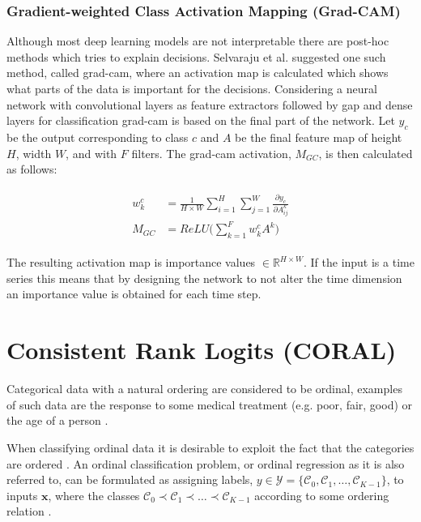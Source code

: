 \subsubsection{Gradient-weighted Class Activation Mapping (Grad-CAM)} \label{sec:grad-cam}
Although most deep learning models are not interpretable there are post-hoc methods which tries to explain decisions. Selvaraju et al. \cite{Selvaraju2016} suggested one such method, called \gls{grad-cam}, where an activation map is calculated which shows what parts of the data is important for the decisions. Considering a neural network with convolutional layers as feature extractors followed by \gls{gap} and dense layers for classification \gls{grad-cam} is based on the final part of the network. Let $y_c$ be the output corresponding to class $c$ and $A$ be the final feature map of height $H$, width $W$, and with $F$ filters. The \gls{grad-cam} activation, $M_{GC}$, is then calculated as follows:

\begin{align}
 \begin{split}
  w_k^c &= \frac{1}{H \times W} \sum_{i=1}^H \sum_{j=1}^W \frac{\partial y_c}{\partial A_{ij}^k} \\
  M_{GC} &= ReLU \big ( \sum_{k=1}^F w_k^c A^k \big)
  \label{eq:grad-cam}
 \end{split}
\end{align}

The resulting activation map is importance values $\in \mathbb{R}^{H \times W}$. If the input is a time series this means that by designing the network to not alter the time dimension an importance value is obtained for each time step.

\section{Consistent Rank Logits (CORAL)}
Categorical data with a natural ordering are considered to be ordinal, examples of such data are the response to some medical treatment (e.g. poor, fair, good) \cite{Agresti2007} or the age of a person \cite{Cao2019}.

When classifying ordinal data it is desirable to exploit the fact that the categories are ordered \cite{Agresti2007}. An ordinal classification problem, or ordinal regression as it is also referred to, can be formulated as assigning labels, $y \in \mathcal{Y} = \{\mathcal{C}_0, \mathcal{C}_1, \hdots, \mathcal{C}_{K-1} \}$, to inputs $\pmb{x}$, where the classes $\mathcal{C}_0 \prec \mathcal{C}_1 \prec \hdots \prec \mathcal{C}_{K-1}$ according to some ordering relation \cite{Cao2019}.

